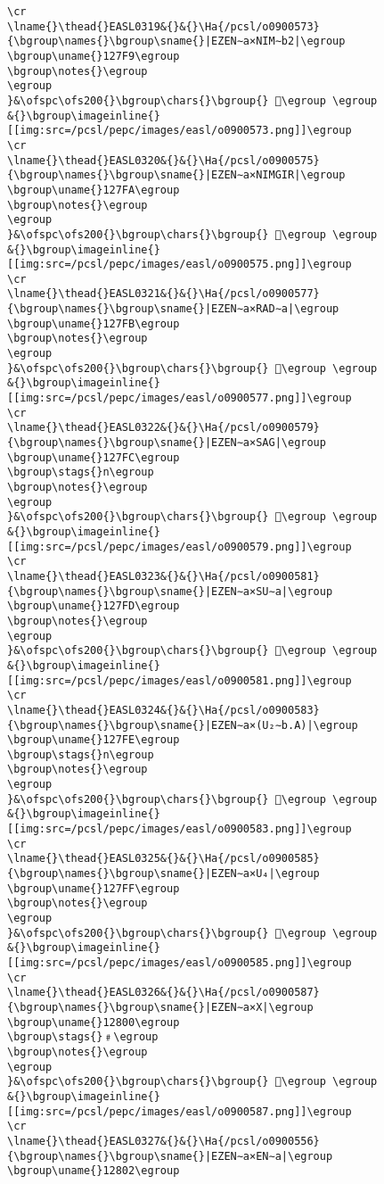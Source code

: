 \begin{verbatim}
\cr
\lname{}\thead{}EASL0319&{}&{}\Ha{/pcsl/o0900573}{\bgroup\names{}\bgroup\sname{}|EZEN∼a×NIM∼b2|\egroup
\bgroup\uname{}127F9\egroup
\bgroup\notes{}\egroup
\egroup
}&\ofspc\ofs200{}\bgroup\chars{}\bgroup{} 𒟹\egroup \egroup
&{}\bgroup\imageinline{}[[img:src=/pcsl/pepc/images/easl/o0900573.png]]\egroup
\cr
\lname{}\thead{}EASL0320&{}&{}\Ha{/pcsl/o0900575}{\bgroup\names{}\bgroup\sname{}|EZEN∼a×NIMGIR|\egroup
\bgroup\uname{}127FA\egroup
\bgroup\notes{}\egroup
\egroup
}&\ofspc\ofs200{}\bgroup\chars{}\bgroup{} 𒟺\egroup \egroup
&{}\bgroup\imageinline{}[[img:src=/pcsl/pepc/images/easl/o0900575.png]]\egroup
\cr
\lname{}\thead{}EASL0321&{}&{}\Ha{/pcsl/o0900577}{\bgroup\names{}\bgroup\sname{}|EZEN∼a×RAD∼a|\egroup
\bgroup\uname{}127FB\egroup
\bgroup\notes{}\egroup
\egroup
}&\ofspc\ofs200{}\bgroup\chars{}\bgroup{} 𒟻\egroup \egroup
&{}\bgroup\imageinline{}[[img:src=/pcsl/pepc/images/easl/o0900577.png]]\egroup
\cr
\lname{}\thead{}EASL0322&{}&{}\Ha{/pcsl/o0900579}{\bgroup\names{}\bgroup\sname{}|EZEN∼a×SAG|\egroup
\bgroup\uname{}127FC\egroup
\bgroup\stags{}n\egroup
\bgroup\notes{}\egroup
\egroup
}&\ofspc\ofs200{}\bgroup\chars{}\bgroup{} 𒟼\egroup \egroup
&{}\bgroup\imageinline{}[[img:src=/pcsl/pepc/images/easl/o0900579.png]]\egroup
\cr
\lname{}\thead{}EASL0323&{}&{}\Ha{/pcsl/o0900581}{\bgroup\names{}\bgroup\sname{}|EZEN∼a×SU∼a|\egroup
\bgroup\uname{}127FD\egroup
\bgroup\notes{}\egroup
\egroup
}&\ofspc\ofs200{}\bgroup\chars{}\bgroup{} 𒟽\egroup \egroup
&{}\bgroup\imageinline{}[[img:src=/pcsl/pepc/images/easl/o0900581.png]]\egroup
\cr
\lname{}\thead{}EASL0324&{}&{}\Ha{/pcsl/o0900583}{\bgroup\names{}\bgroup\sname{}|EZEN∼a×(U₂∼b.A)|\egroup
\bgroup\uname{}127FE\egroup
\bgroup\stags{}n\egroup
\bgroup\notes{}\egroup
\egroup
}&\ofspc\ofs200{}\bgroup\chars{}\bgroup{} 𒟾\egroup \egroup
&{}\bgroup\imageinline{}[[img:src=/pcsl/pepc/images/easl/o0900583.png]]\egroup
\cr
\lname{}\thead{}EASL0325&{}&{}\Ha{/pcsl/o0900585}{\bgroup\names{}\bgroup\sname{}|EZEN∼a×U₄|\egroup
\bgroup\uname{}127FF\egroup
\bgroup\notes{}\egroup
\egroup
}&\ofspc\ofs200{}\bgroup\chars{}\bgroup{} 𒟿\egroup \egroup
&{}\bgroup\imageinline{}[[img:src=/pcsl/pepc/images/easl/o0900585.png]]\egroup
\cr
\lname{}\thead{}EASL0326&{}&{}\Ha{/pcsl/o0900587}{\bgroup\names{}\bgroup\sname{}|EZEN∼a×X|\egroup
\bgroup\uname{}12800\egroup
\bgroup\stags{}﹟\egroup
\bgroup\notes{}\egroup
\egroup
}&\ofspc\ofs200{}\bgroup\chars{}\bgroup{} 𒠀\egroup \egroup
&{}\bgroup\imageinline{}[[img:src=/pcsl/pepc/images/easl/o0900587.png]]\egroup
\cr
\lname{}\thead{}EASL0327&{}&{}\Ha{/pcsl/o0900556}{\bgroup\names{}\bgroup\sname{}|EZEN∼a×EN∼a|\egroup
\bgroup\uname{}12802\egroup

\end{verbatim}
